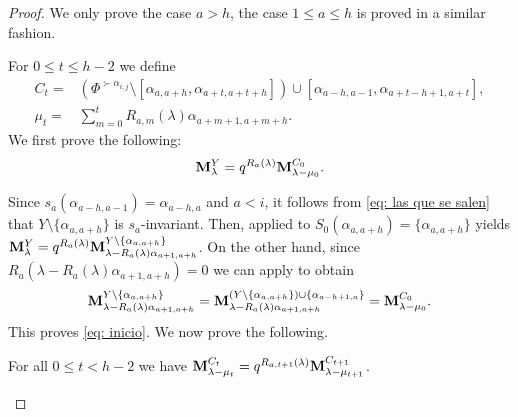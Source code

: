 \begin{proof}
We only prove the case $a>h$, the case $1\leq a \leq h$ is proved in a similar fashion. 

For $0\leq t \leq h-2$ we define 
\begin{equation}
\begin{array}{rl}
    C_{t} =  & \left(\Phi^{\succ \alpha_{i,j}}\setminus [\alpha_{a,a+h},\alpha_{a+t,a+t+h}]\right)\cup [\alpha_{a-h,a-1},\alpha_{a+t-h+1,a+t}], \\[5pt]
    \mu_{t} =  & \displaystyle  \sum_{m=0}^{t}R_{a,m}(\lambda)\alpha_{a+m+1,a+m+h}.
\end{array}
\end{equation}
We first prove the following:
\begin{equation}\label{eq: inicio}
    \mathbf{M}_{\lambda}^{Y} =q^{R_a(\lambda)}\mathbf{M}_{\lambda - \mu_0 }^{C_0}.  
\end{equation}

Since $s_{a}(\alpha_{a-h,a-1}) = \alpha_{a-h,a}$ and $a<i$, it follows from \cref{eq: las que se salen} that $Y \setminus \{\alpha_{a,a+h}\}$ is $s_{a}$-invariant.
Then,  applied to $S_{0}(\alpha_{a,a+h})=\{\alpha_{a,a+h}\}$ yields $\mathbf{M}_{\lambda}^{Y} = q^{R_{a}(\lambda)}\mathbf{M}_{\lambda - R_{a}(\lambda)\alpha_{a+1,a+h}}^{Y\setminus \{\alpha_{a,a+h}\}}$.
On the other hand,  since $R_a(\lambda - R_{a}(\lambda)\alpha_{a+1,a+h})=0$ we can apply   to obtain 
\begin{equation}\label{eq: fifth string lemma 1}
\mathbf{M}_{\lambda - R_{a}(\lambda)\alpha_{a+1,a+h}}^{Y\setminus \{\alpha_{a,a+h}\}} =\mathbf{M}_{\lambda - R_{a}(\lambda)\alpha_{a+1,a+h}}^{(Y\setminus \{\alpha_{a,a+h}\})\cup \{\alpha_{a-h+1,a}\}}= \mathbf{M}_{\lambda - \mu_0}^{C_0} .
\end{equation}
This proves \eqref{eq: inicio}. 
We now prove the following. 

\begin{claim}\label{claimclaimclaim1}
    For all $0\leq t < h-2$ we have $\mathbf{M}_{\lambda - \mu_{t}}^{C_{t}} = q^{R_{a,t+1}(\lambda)}\mathbf{M}_{\lambda - \mu_{t+1}}^{C_{t+1}}$.
\end{claim}


\end{proof}
